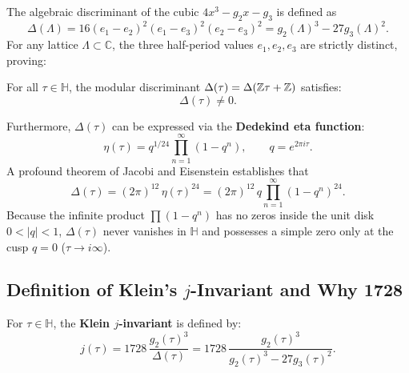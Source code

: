 \documentclass[a4paper]{article}
\begin{document}
The algebraic discriminant of the cubic $4x^3 - g_2 x - g_3$ is defined as
\begin{equation}
 \Delta(\Lambda) = 16 (e_1 - e_2)^2 (e_1 - e_3)^2 (e_2 - e_3)^2 = g_2(\Lambda)^3 - 27 g_3(\Lambda)^2.
 \label{eq:delta_def}
\end{equation}
For any lattice $\Lambda \subset \mathbb{C}$, the three half-period values $e_1, e_2, e_3$ are strictly distinct, proving:
\begin{proposition}
For all $\tau \in \mathbb{H}$, the modular discriminant $\Delta(\tau) = \Delta(\mathbb{Z}\tau + \mathbb{Z})$ satisfies:
\begin{equation}
 \Delta(\tau) \ne 0.
\end{equation}
\end{proposition}

Furthermore, $\Delta(\tau)$ can be expressed via the \textbf{Dedekind eta function}:
\begin{equation}
 \eta(\tau) = q^{1/24} \prod_{n=1}^\infty (1 - q^n), \qquad q = e^{2\pi i \tau}.
\end{equation}
A profound theorem of Jacobi and Eisenstein establishes that
\begin{equation}
 \Delta(\tau) = (2\pi)^{12} \, \eta(\tau)^{24} = (2\pi)^{12} \, q \prod_{n=1}^\infty (1 - q^n)^{24}.
 \label{eq:delta_eta}
\end{equation}
Because the infinite product $\prod (1 - q^n)$ has no zeros inside the unit disk $0 < |q| < 1$, $\Delta(\tau)$ never vanishes in $\mathbb{H}$ and possesses a simple zero only at the cusp $q = 0$ ($\tau \to i\infty$).

\subsection{Definition of Klein's \texorpdfstring{$j$}{j}-Invariant and Why 1728}
\begin{definition}
For $\tau \in \mathbb{H}$, the \textbf{Klein $j$-invariant} is defined by:
\begin{equation}
 \boxed{j(\tau) = 1728 \, \frac{g_2(\tau)^3}{\Delta(\tau)} = 1728 \, \frac{g_2(\tau)^3}{g_2(\tau)^3 - 27 g_3(\tau)^2}}.
 \label{eq:j_def}
\end{equation}
\end{definition}
\end{document}
